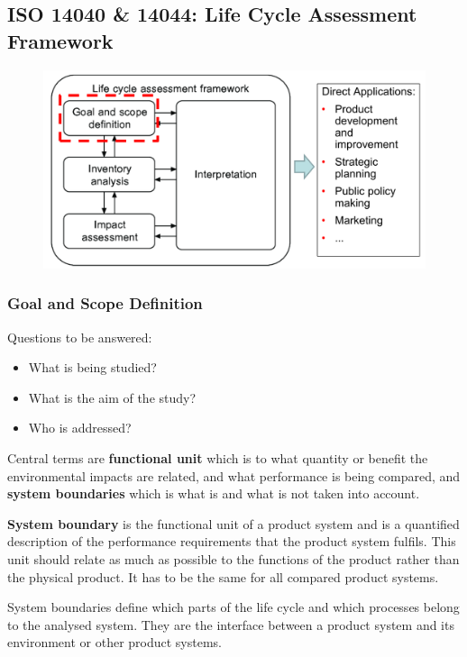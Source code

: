 \documentclass[11pt]{article}
\theoremstyle{definition}
\begin{document}
\subsection{ISO 14040 \& 14044: Life Cycle Assessment Framework}
\begin{figure}[tbh]
	\centering
	\includegraphics[width=0.8\linewidth]{img/iso_life_cycle_assessment}
\end{figure}

\subsubsection{Goal and Scope Definition}
Questions to be answered:
\begin{itemize}
	\item What is being studied?
	\item What is the aim of the study?
	\item Who is addressed?
\end{itemize}

Central terms are \textbf{functional unit} which is to what quantity or benefit the environmental impacts are related, and what performance is being compared, and \textbf{system boundaries} which is what is and what is not taken into account.

\begin{definition}
	\textbf{System boundary} is the functional unit of a product system and is a quantified description of the performance requirements that the product system fulfils. This unit should relate as much as possible to the functions of the product rather than the physical product. It has to be the same for all compared product systems.
\end{definition}

System boundaries define which parts of the life cycle and which processes belong to the analysed system. They are the interface between a product system and its environment or other product systems.
\end{document}
